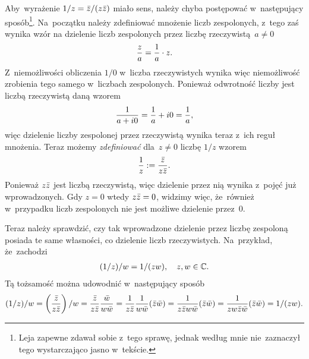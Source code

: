 \documentclass[a4paper,11pt]{article}
\begin{document}
\start {} Aby~wyrażenie $1 / z = \bar{ z } / ( z \bar{ z } )$ miało
sens, należy chyba postępować w~następujący sposób\footnote{Leja
  zapewne zdawał sobie z~tego sprawę, jednak według mnie nie~zaznaczył
  tego wystarczająco jasno w~tekście.}. Na~początku należy zdefiniować
mnożenie liczb zespolonych, z~tego zaś wynika wzór na dzielenie liczb
zespolonych przez liczbę rzeczywistą~$a \neq 0$
\begin{equation}
  \label{eq:Leja-02}
  \begin{split}
    \frac{ z }{ a } = \frac{ 1 }{  a  } \cdot z.
  \end{split}
\end{equation}
Z~niemożliwości obliczenia $1 / 0$ w~liczba rzeczywistych wynika więc
niemożliwość zrobienia tego samego w~liczbach zespolonych. Ponieważ
odwrotność liczby jest liczbą rzeczywistą daną wzorem
\begin{equation}
  \label{eq:Leja-03}
  \begin{split}
    \frac{ 1 }{  a + i0  } = \frac{ 1 }{  a  } + i0 = \frac{ 1 }{  a  },
  \end{split}
\end{equation}
więc dzielenie liczby zespolonej przez rzeczywistą wynika teraz z~ich
reguł mnożenia. Teraz możemy \emph{zdefiniować} dla~$z \neq 0$ liczbę
$1 / z$ wzorem
\begin{equation}
  \label{eq:Leja-04}
  \begin{split}
    \frac{ 1 }{  z  } := \frac{ \bar{ z } }{ z \bar{ z } }.
  \end{split}
\end{equation}
Ponieważ $z \bar{ z }$ jest liczbą rzeczywistą, więc dzielenie przez nią
wynika z~pojęć już wprowadzonych. Gdy $z = 0$ wtedy $z \bar{ z } = 0$,
widzimy więc, że~również w~przypadku liczb zespolonych nie jest
możliwe dzielenie przez~0.

Teraz należy sprawdzić, czy tak wprowadzone dzielenie przez liczbę
zespoloną posiada te same własności, co dzielenie liczb rzeczywistych.
Na~przykład, że~zachodzi
\begin{equation}
  \label{eq:Leja-05}
  \begin{split}
    ( 1 / z ) / w = 1 / ( z w ), \quad z, w \in \mathbb{C}.
  \end{split}
\end{equation}
Tą tożsamość można udowodnić w~następujący sposób
\begin{equation}
  \label{eq:Leja-06}
  \begin{split}
    ( 1 / z ) / w = \left( \frac{ \bar{ z } }{ z \bar{ z } } \right) / w = \frac{
      \bar{ z } }{ z \bar{ z } } \frac{ \bar{ w } }{ w \bar{ w } } = \frac{ 1 }{  z \bar{ z }  }
    \frac{ 1 }{  w \bar{ w }  } ( \bar{ z } \bar{ w } ) = \frac{ 1 }{  z \bar{ z } w \bar{ w }  } (
    \bar{ z } \bar{ w } ) = \frac{ 1 }{  z w \bar{ z } \bar{ w }  } ( \bar{ z } \bar{ w } ) = 1 / (
    z w ).
  \end{split}
\end{equation}
\end{document}
